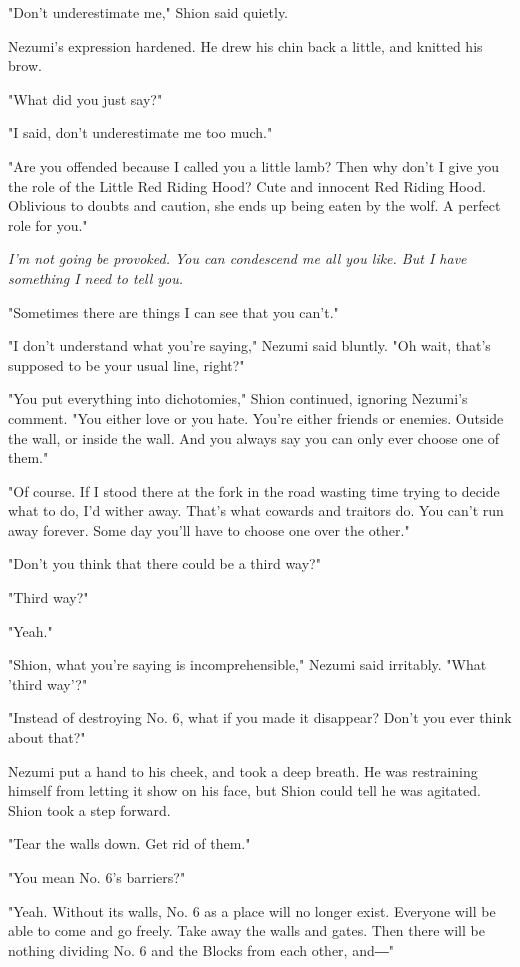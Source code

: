 "Don't underestimate me," Shion said quietly.

Nezumi's expression hardened. He drew his chin back a little, and
knitted his brow.

"What did you just say?"

"I said, don't underestimate me too much."

"Are you offended because I called you a little lamb? Then why don't I
give you the role of the Little Red Riding Hood? Cute and innocent Red
Riding Hood. Oblivious to doubts and caution, she ends up being eaten by
the wolf. A perfect role for you."

\emph{I'm not going be provoked. You can condescend me all you like. But I
have something I need to tell you.}

"Sometimes there are things I can see that you can't."

"I don't understand what you're saying," Nezumi said bluntly. "Oh wait,
that's supposed to be your usual line, right?"

"You put everything into dichotomies," Shion continued, ignoring
Nezumi's comment. "You either love or you hate. You're either friends or
enemies. Outside the wall, or inside the wall. And you always say you
can only ever choose one of them."

"Of course. If I stood there at the fork in the road wasting time trying
to decide what to do, I'd wither away. That's what cowards and traitors
do. You can't run away forever. Some day you'll have to choose one over
the other."

"Don't you think that there could be a third way?"

"Third way?"

"Yeah."

"Shion, what you're saying is incomprehensible," Nezumi said irritably.
"What 'third way'?"

"Instead of destroying No. 6, what if you made it disappear? Don't you
ever think about that?"

Nezumi put a hand to his cheek, and took a deep breath. He was
restraining himself from letting it show on his face, but Shion could
tell he was agitated. Shion took a step forward.

"Tear the walls down. Get rid of them."

"You mean No. 6's barriers?"

"Yeah. Without its walls, No. 6 as a place will no longer exist.
Everyone will be able to come and go freely. Take away the walls and
gates. Then there will be nothing dividing No. 6 and the Blocks from
each other, and―"

